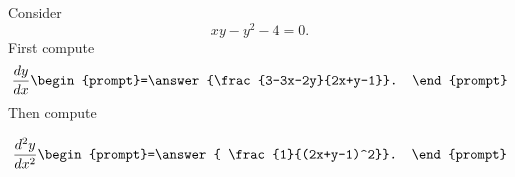 \documentclass{ximera}
\author{Steven Gubkin\and Nela Lakos}
\begin{document}
\begin{exercise}

Consider
\[
xy- y^2-4=0.
\]
First compute
\[
\frac{dy}{dx} \begin{prompt}=\answer{\frac{3-3x-2y}{2x+y-1}}.
\end{prompt}
\]
Then compute

\[
\frac{d^2y}{dx^2}  \begin{prompt}=\answer{ \frac{1}{(2x+y-1)^2}}.
\end{prompt}
\]

\end{exercise}
\end{document}
